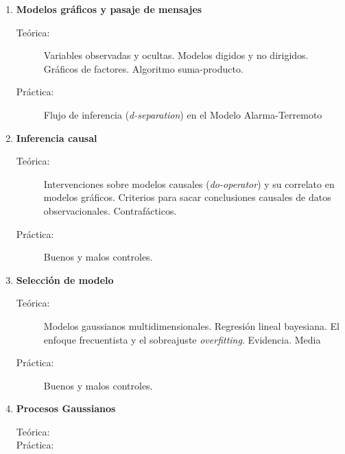 \documentclass[10pt]{article}
\begin{document}
\begin{enumerate}

\vspace{0.1cm}
\item \textbf{Modelos gráficos y pasaje de mensajes}
\vspace{-0.15cm}
\begin{description}
\item[Teórica:] Variables observadas y ocultas. Modelos digidos y no dirigidos. Gráficos de factores. Algoritmo suma-producto. 
\item[Práctica:] Flujo de inferencia (\emph{d-separation}) en el Modelo Alarma-Terremoto
\end{description}


\vspace{0.1cm}
\item \textbf{Inferencia causal}
\vspace{-0.15cm}
\begin{description}
\item[Teórica:] Intervenciones sobre modelos causales (\emph{do-operator}) y su correlato en modelos gráficos. Criterios para sacar conclusiones causales de datos observacionales. Contrafácticos. 
\item[Práctica:] Buenos y malos controles.
\end{description}


\vspace{0.1cm}
\item \textbf{Selección de modelo}
\vspace{-0.15cm}
\begin{description}
\item[Teórica:] Modelos gaussianos multidimensionales. Regresión lineal bayesiana. El enfoque frecuentista y el sobreajuste \emph{overfitting}. Evidencia. Media 
\item[Práctica:] Buenos y malos controles.
\end{description}


\vspace{0.1cm}
\item \textbf{Procesos Gaussianos}
\vspace{-0.15cm}
\begin{description}
\item[Teórica:]
\item[Práctica:]
\end{description}


\end{enumerate}
\end{document}
